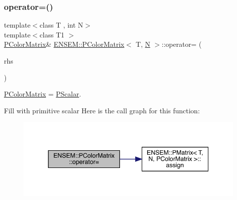 \subsubsection{\texorpdfstring{operator=()}{operator=()}\hspace{0.1cm}{\footnotesize\ttfamily [2/6]}}
{\footnotesize\ttfamily template$<$class T , int N$>$ \\
template$<$class T1 $>$ \\
\mbox{\hyperlink{classENSEM_1_1PColorMatrix}{P\+Color\+Matrix}}\& \mbox{\hyperlink{classENSEM_1_1PColorMatrix}{E\+N\+S\+E\+M\+::\+P\+Color\+Matrix}}$<$ T, \mbox{\hyperlink{adat__devel_2lib_2hadron_2operator__name__util_8cc_a7722c8ecbb62d99aee7ce68b1752f337}{N}} $>$\+::operator= (\begin{DoxyParamCaption}\item[{const \mbox{\hyperlink{classENSEM_1_1PScalar}{P\+Scalar}}$<$ T1 $>$ \&}]{rhs }\end{DoxyParamCaption})\hspace{0.3cm}{\ttfamily [inline]}}



\mbox{\hyperlink{classENSEM_1_1PColorMatrix}{P\+Color\+Matrix}} = \mbox{\hyperlink{classENSEM_1_1PScalar}{P\+Scalar}}. 

Fill with primitive scalar Here is the call graph for this function\+:
\nopagebreak
\begin{figure}[H]
\begin{center}
\leavevmode
\includegraphics[width=338pt]{d8/d21/classENSEM_1_1PColorMatrix_a7750e72b224e47b6a559f3dc112b72d3_cgraph}
\end{center}
\end{figure}
\mbox{\label{classENSEM_1_1PColorMatrix_a7750e72b224e47b6a559f3dc112b72d3}} 
